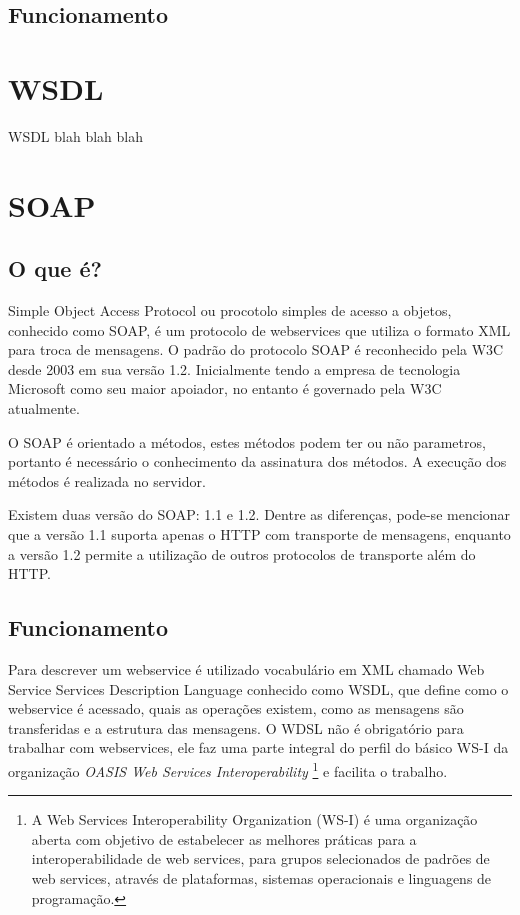 \documentclass{acm_proc_article-sp}
\begin{document}
	
	\subsection{Funcionamento}
		
		
		
\section{WSDL}
	
		WSDL blah blah blah
	
\section{SOAP}
	\subsection{O que é?}
	
		Simple Object Access Protocol ou procotolo simples de acesso a objetos, conhecido como SOAP, é um protocolo de webservices que utiliza o formato XML para troca de mensagens. O padrão do protocolo SOAP é reconhecido pela W3C desde 2003 em sua versão 1.2. Inicialmente tendo a empresa de tecnologia Microsoft como seu maior apoiador, no entanto é governado pela W3C atualmente.
		
		O SOAP é orientado a métodos, estes métodos podem ter ou não parametros, portanto é necessário o conhecimento da assinatura dos métodos. A execução dos métodos é realizada no servidor.
		
		Existem duas versão do SOAP: 1.1 e 1.2. Dentre as diferenças, pode-se mencionar que a versão 1.1 suporta apenas o HTTP com transporte de mensagens, enquanto a versão 1.2 permite a utilização de outros protocolos de transporte além do HTTP. \cite{WEBSERVICESZEND}
		
	\subsection{Funcionamento}
	
		Para descrever um webservice é utilizado vocabulário em XML chamado Web Service Services Description Language conhecido como WSDL, que define como o webservice é acessado, quais as operações existem, como as mensagens são transferidas e a estrutura das mensagens. O WDSL não é obrigatório para trabalhar com webservices, ele faz uma parte integral do perfil do básico WS-I da organização \emph{OASIS Web Services Interoperability} \footnote{A Web Services Interoperability Organization (WS-I) é uma organização aberta com objetivo de estabelecer as melhores práticas para a interoperabilidade de web services, para grupos selecionados de padrões de web services, através de plataformas, sistemas operacionais e linguagens de programação.\cite{OASIS-WS-I-SITE}} e facilita o trabalho. 
		
\end{document}
